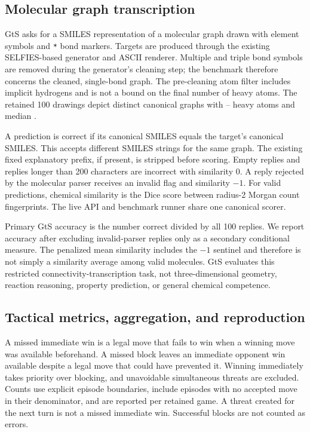 \documentclass[12pt,letterpaper]{article}
\begin{document}
\subsection*{Molecular graph transcription}
GtS asks for a SMILES representation of a molecular graph drawn with element symbols and \texttt{*} bond markers. Targets are produced through the existing SELFIES-based generator and ASCII renderer. Multiple and triple bond symbols are removed during the generator's cleaning step; the benchmark therefore concerns the cleaned, single-bond graph. The pre-cleaning atom filter includes implicit hydrogens and is not a bound on the final number of heavy atoms. The retained 100 drawings depict \UniqueMolecules{} distinct canonical graphs with \MinHeavyAtoms{}--\MaxHeavyAtoms{} heavy atoms and median \MedianHeavyAtoms{}.

A prediction is correct if its canonical SMILES equals the target's canonical SMILES. This accepts different SMILES strings for the same graph. The existing fixed explanatory prefix, if present, is stripped before scoring. Empty replies and replies longer than 200 characters are incorrect with similarity 0. A reply rejected by the molecular parser receives an invalid flag and similarity $-1$. For valid predictions, chemical similarity is the Dice score between radius-2 Morgan count fingerprints. The live API and benchmark runner share one canonical scorer.

Primary GtS accuracy is the number correct divided by all 100 replies. We report accuracy after excluding invalid-parser replies only as a secondary conditional measure. The penalized mean similarity includes the $-1$ sentinel and therefore is not simply a similarity average among valid molecules. GtS evaluates this restricted connectivity-transcription task, not three-dimensional geometry, reaction reasoning, property prediction, or general chemical competence.

\subsection*{Tactical metrics, aggregation, and reproduction}
A missed immediate win is a legal move that fails to win when a winning move was available beforehand. A missed block leaves an immediate opponent win available despite a legal move that could have prevented it. Winning immediately takes priority over blocking, and unavoidable simultaneous threats are excluded. Counts use explicit episode boundaries, include episodes with no accepted move in their denominator, and are reported per retained game. A threat created for the next turn is not a missed immediate win. Successful blocks are not counted as errors.
\end{document}
